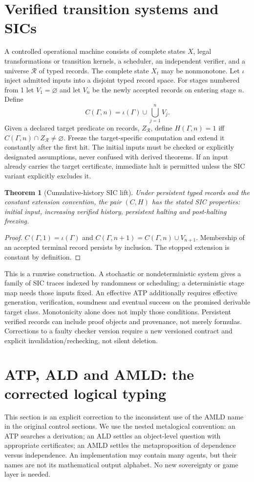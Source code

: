 \documentclass[11pt]{article}
\newtheorem{theorem}{Theorem}[section]\newtheorem{proposition}[theorem]{Proposition}\newtheorem{lemma}[theorem]{Lemma}\newtheorem{corollary}[theorem]{Corollary}
\theoremstyle{definition}\newtheorem{definition}[theorem]{Definition}\newtheorem{example}[theorem]{Example}\newtheorem{conjecture}[theorem]{Conjecture}
\begin{document}
\section{Verified transition systems and SICs}
A controlled operational machine consists of complete states $X$, legal transformations or transition kernels, a scheduler, an independent verifier, and a universe $\mathcal R$ of typed records. The complete state $X_t$ may be nonmonotone. Let $\iota$ inject admitted inputs into a disjoint typed record space. For stages numbered from 1 let $V_1=\varnothing$ and let $V_n$ be the newly accepted records on entering stage $n$. Define
\[ C(\Gamma,n)=\iota(\Gamma)\cup\bigcup_{j=1}^n V_j.\]
Given a declared target predicate on records, $Z_{\mathcal R}$, define $H(\Gamma,n)=1$ iff $C(\Gamma,n)\cap Z_{\mathcal R}\ne\varnothing$. Freeze the target-specific computation and extend it constantly after the first hit. The initial inputs must be checked or explicitly designated assumptions, never confused with derived theorems. If an input already carries the target certificate, immediate halt is permitted unless the SIC variant explicitly excludes it.
\begin{theorem}[Cumulative-history SIC lift]
Under persistent typed records and the constant extension convention, the pair $(C,H)$ has the stated SIC properties: initial input, increasing verified history, persistent halting and post-halting freezing.
\end{theorem}
\begin{proof} $C(\Gamma,1)=\iota(\Gamma)$ and $C(\Gamma,n+1)=C(\Gamma,n)\cup V_{n+1}$. Membership of an accepted terminal record persists by inclusion. The stopped extension is constant by definition.\end{proof}
This is a runwise construction. A stochastic or nondeterministic system gives a family of SIC traces indexed by randomness or scheduling; a deterministic stage map needs those inputs fixed. An effective ATP additionally requires effective generation, verification, soundness and eventual success on the promised derivable target class. Monotonicity alone does not imply those conditions. Persistent verified records can include proof objects and provenance, not merely formulas. Corrections to a faulty checker version require a new versioned contract and explicit invalidation/rechecking, not silent deletion.
\section{ATP, ALD and AMLD: the corrected logical typing}\label{sec:types}
This section is an explicit correction to the inconsistent use of the AMLD name in the original control sections. We use the nested metalogical convention: an ATP searches a derivation; an ALD settles an object-level question with appropriate certificates; an AMLD settles the metaproposition of dependence versus independence. An implementation may contain many agents, but their names are not its mathematical output alphabet. No new sovereignty or game layer is needed.
\end{document}
